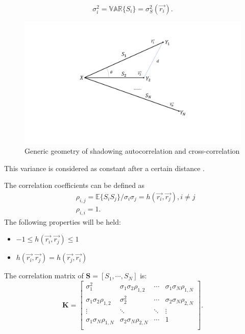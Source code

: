 \begin{equation}
\sigma_{i}^{2} = \mathbb{VAR}\{S_{i}\} = \sigma_{S}^2(\vec{r_{i}}).
\label{eq:1}
\end{equation}
\begin{figure} 
\centering
\includegraphics[width=14cm]{FadingGeometry.pdf}
\caption{Generic geometry of shadowing autocorrelation and cross-correlation}
\label{fig:2}
\end{figure}
This variance is considered as constant after a certain distance \cite{kitchener2006correlated}.
\par The correlation coefficients can be defined as
\begin{equation}
\begin{split}
& \rho_{i,j} = \mathbb{E}\{S_{i}S_{j}\}/\sigma_{i}\sigma_{j} = h(\vec{r_{i}}, \vec{r_{j}}), i \neq j \\
& \rho_{i,i} = 1.
\end{split}
\label{eq:2}
\end{equation}
The following properties will be held:
\begin{itemize} 
\item $-1\leq h(\vec{r_{i}}, \vec{r_{j}}) \leq 1$
\item $h(\vec{r_{i}}, \vec{r_{j}})  = h(\vec{r_{j}}, \vec{r_{i}}) $
\end{itemize}
The correlation matrix of $\mathbf{S} = [S_{1}, \cdots, S_{N}]$ is:
\begin{equation}
\mathbf{K} = \left[\begin{array}{cccc}
\sigma_{1}^{2} & \sigma_{1}\sigma_{2}\rho_{1,2} & \cdots & \sigma_{1}\sigma_{N}\rho_{1,N}\\
\sigma_{1}\sigma_{2}\rho_{1,2} & \sigma_{2}^{2} & \cdots & \sigma_{2}\sigma_{N}\rho_{2,N}\\
\vdots & \ddots & \ddots & \vdots\\
\sigma_{1}\sigma_{N}\rho_{1,N} & \sigma_{2}\sigma_{N}\rho_{2,N} & \cdots & 1\\
\end{array}\right].
\label{eq:3}
\end{equation}

